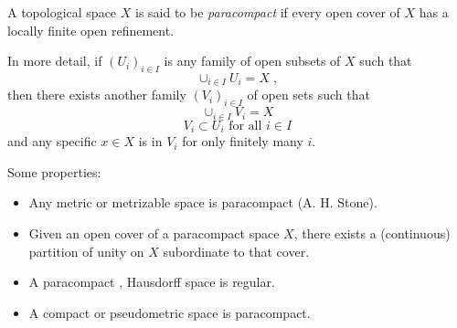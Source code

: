 \documentclass{article}
\begin{document}
A topological space $X$ is said to be \emph{paracompact} if every open cover of $X$ has a locally finite open refinement.

In more detail, if $(U_i)_{i\in I}$ is any family of open subsets of $X$ such that $$\cup_{i\in I}U_i = X\;,$$
then there exists another family $(V_i)_{i\in I}$ of open sets such that
$$\cup_{i\in I}V_i = X$$
$$V_i\subset U_i\text{ for all }i\in I$$
and any specific $x\in X$ is in $V_i$ for only finitely many $i$.

Some properties:
\begin{itemize}
\item Any metric or metrizable space is paracompact (A. H. Stone). 
\item Given an open cover of a paracompact space $X$, there exists a (continuous) partition of unity on $X$ subordinate to that cover.
\item A paracompact , Hausdorff space is regular.
\item A compact or pseudometric space is paracompact.
\end{itemize}
\end{document}
